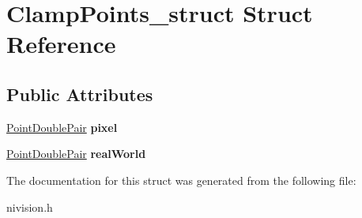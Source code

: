 \hypertarget{structClampPoints__struct}{
\section{ClampPoints\_\-struct Struct Reference}
\label{structClampPoints__struct}
}
\subsection*{Public Attributes}
\begin{DoxyCompactItemize}
\item 
\hypertarget{structClampPoints__struct_a1bc465c91fa9807189533e81e18fd537}{
\hyperlink{structPointDoublePair__struct}{PointDoublePair} {\bfseries pixel}}
\label{structClampPoints__struct_a1bc465c91fa9807189533e81e18fd537}

\item 
\hypertarget{structClampPoints__struct_abe7936ba76c5324bbcdfb7aa42ee4d39}{
\hyperlink{structPointDoublePair__struct}{PointDoublePair} {\bfseries realWorld}}
\label{structClampPoints__struct_abe7936ba76c5324bbcdfb7aa42ee4d39}

\end{DoxyCompactItemize}


The documentation for this struct was generated from the following file:\begin{DoxyCompactItemize}
\item 
nivision.h\end{DoxyCompactItemize}
